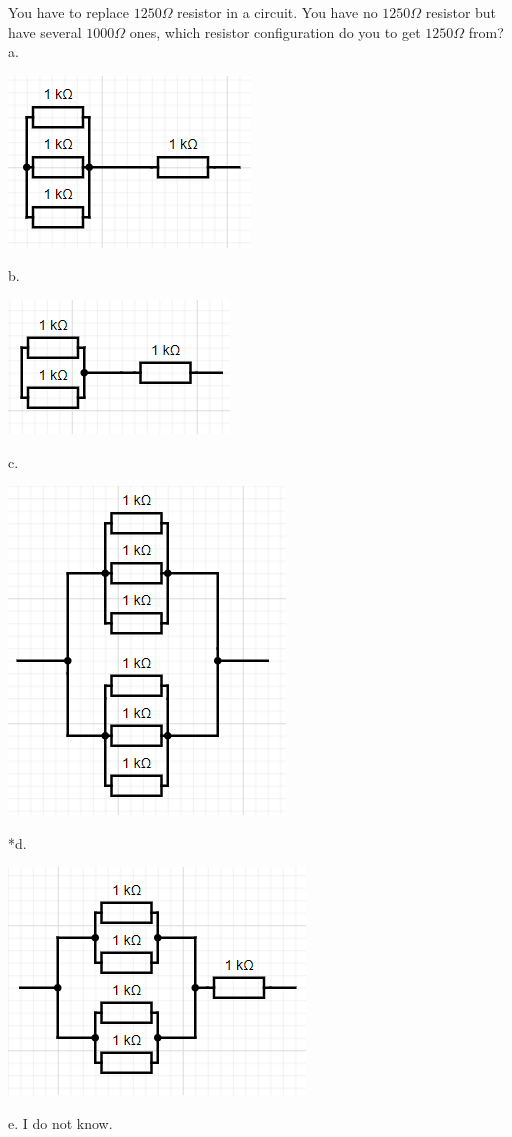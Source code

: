 
You have to replace \( 1250 \Omega \) resistor in a circuit. You have no \( 1250 \Omega \) resistor but have several \( 1000 \Omega \) ones, which resistor configuration do you to get \( 1250 \Omega \) from?\\ 

a. 

\includegraphics[width=2.53125in,height=1.79167in]{../../Images/BasicElectronicComponentsQ18a.png}

b. 

\includegraphics[width=2.3125in,height=1.39583in]{../../Images/BasicElectronicComponentsQ18b.png}

c. 

\includegraphics[width=2.89583in,height=3.42708in]{../../Images/BasicElectronicComponentsQ18c.png}

*d. 

\includegraphics[width=3.10417in,height=2.375in]{../../Images/BasicElectronicComponentsQ18d.png}

e. I do not know.\\
